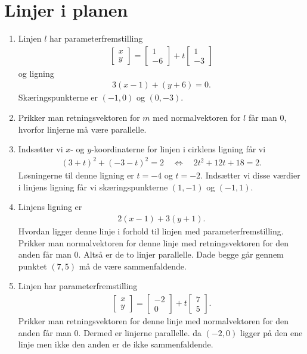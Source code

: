 \section{Linjer i planen}
\begin{enumerate}
	\item Linjen $l$ har parameterfremstilling
	\begin{align*}
	\begin{bmatrix}
	x\\y
	\end{bmatrix}=\begin{bmatrix}
	1\\-6
	\end{bmatrix}+t \begin{bmatrix}
	1\\-3
	\end{bmatrix}
	\end{align*}
	og ligning
	\begin{align*}
	3(x-1)+(y+6)=0.
	\end{align*}
	Skæringspunkterne er $(-1,0)$ og $(0,-3)$.
	
	\item Prikker man retningsvektoren for $m$ med normalvektoren for $l$ får man $0$, hvorfor linjerne må være parallelle.
	
	\item Indsætter vi $x$- og $y$-koordinaterne for linjen i cirklens ligning får vi
	\begin{align*}
	(3+t)^2+(-3-t)^2=2\quad \Leftrightarrow\quad 2t^2+12t+18=2.
	\end{align*} 
	Løsningerne til denne ligning er $t=-4$ og $t=-2$. Indsætter vi disse værdier i linjens ligning får vi skæringspunkterne $(1,-1)$ og $(-1,1)$.
	
		
	\item Linjens ligning er
	\begin{align*}
	2(x-1)+3(y+1).
	\end{align*}
	Hvordan ligger denne linje i forhold til linjen med parameterfremstilling. Prikker man normalvektoren for denne linje med retningsvektoren for den anden får man $0$. Altså er de to linjer parallelle. Dade begge går gennem punktet $(7,5)$ må de være sammenfaldende.
	
	
	
	
	\item Linjen har parameterfremstilling
	\begin{align*}
		\begin{bmatrix}
		x\\y
		\end{bmatrix}=\begin{bmatrix}
		-2\\0
		\end{bmatrix}+t \begin{bmatrix}
		7\\5
		\end{bmatrix}.
	\end{align*}
 	Prikker man retningsvektoren for denne linje med normalvektoren for den anden får man $0$. Dermed er linjerne parallelle. da $(-2,0)$ ligger på den ene linje men ikke den anden er de ikke sammenfaldende.
		

\end{enumerate}
